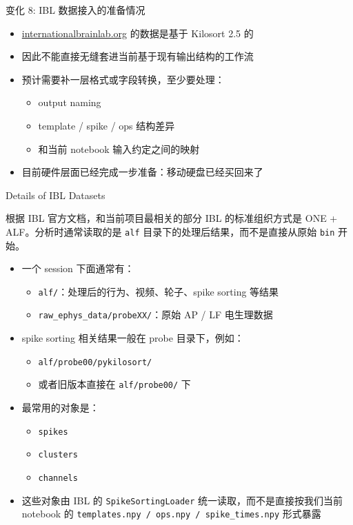 \documentclass[aspectratio=169,11pt]{beamer}
\begin{document}
\begin{frame}{变化 8: IBL 数据接入的准备情况}
  \begin{itemize}
    \item \url{internationalbrainlab.org} 的数据是基于 Kilosort 2.5 的
    \item 因此不能直接无缝套进当前基于现有输出结构的工作流
    \item 预计需要补一层格式或字段转换，至少要处理：
    \begin{itemize}
      \item output naming
      \item template / spike / ops 结构差异
      \item 和当前 notebook 输入约定之间的映射
    \end{itemize}
    \item 目前硬件层面已经完成一步准备：\alert{移动硬盘已经买回来了}
  \end{itemize}
\end{frame}

\begin{frame}{Details of IBL Datasets}
  \small
  \begin{block}{根据 IBL 官方文档，和当前项目最相关的部分}
    IBL 的标准组织方式是 ONE + ALF。分析时通常读取的是 \texttt{alf} 目录下的处理后结果，而不是直接从原始 \texttt{bin} 开始。
  \end{block}
  \begin{itemize}
    \item 一个 session 下面通常有：
    \begin{itemize}
      \item \texttt{alf/}：处理后的行为、视频、轮子、spike sorting 等结果
      \item \texttt{raw\_ephys\_data/probeXX/}：原始 AP / LF 电生理数据
    \end{itemize}
    \item spike sorting 相关结果一般在 probe 目录下，例如：
    \begin{itemize}
      \item \texttt{alf/probe00/pykilosort/}
      \item 或者旧版本直接在 \texttt{alf/probe00/} 下
    \end{itemize}
    \item 最常用的对象是：
    \begin{itemize}
      \item \texttt{spikes}
      \item \texttt{clusters}
      \item \texttt{channels}
    \end{itemize}
    \item 这些对象由 IBL 的 \texttt{SpikeSortingLoader} 统一读取，而不是直接按我们当前 notebook 的 \texttt{templates.npy / ops.npy / spike\_times.npy} 形式暴露
  \end{itemize}
\end{frame}
\end{document}
